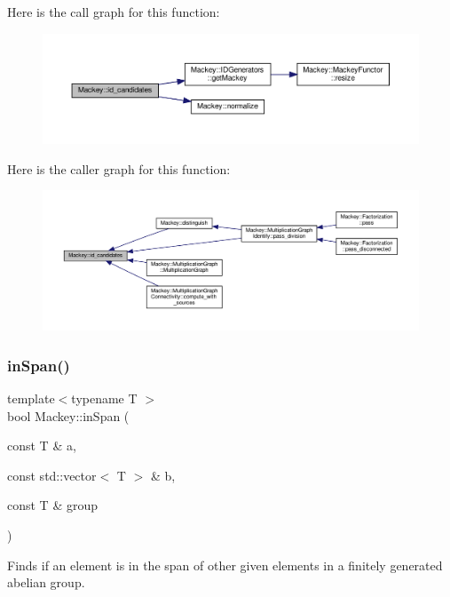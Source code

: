 Here is the call graph for this function\+:\nopagebreak
\begin{figure}[H]
\begin{center}
\leavevmode
\includegraphics[width=350pt]{namespaceMackey_a83ac78e6d1695af40d0fa58af5255e84_cgraph}
\end{center}
\end{figure}
Here is the caller graph for this function\+:\nopagebreak
\begin{figure}[H]
\begin{center}
\leavevmode
\includegraphics[width=350pt]{namespaceMackey_a83ac78e6d1695af40d0fa58af5255e84_icgraph}
\end{center}
\end{figure}
\mbox{\label{namespaceMackey_a1ff253bf7e043ad6455b5fea23a83f09}} 
\subsubsection{\texorpdfstring{in\+Span()}{inSpan()}}
{\footnotesize\ttfamily template$<$typename T $>$ \\
bool Mackey\+::in\+Span (\begin{DoxyParamCaption}\item[{const T \&}]{a,  }\item[{const std\+::vector$<$ T $>$ \&}]{b,  }\item[{const T \&}]{group }\end{DoxyParamCaption})}



Finds if an element is in the span of other given elements in a finitely generated abelian group. 

